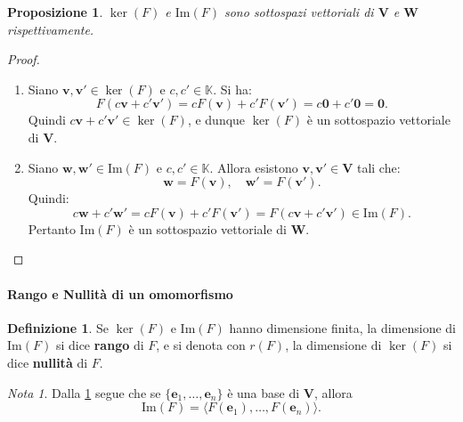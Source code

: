 \documentclass{article}
\theoremstyle{plain}
\newtheorem{prop}[thm]{Proposizione}
\theoremstyle{definition}
\newtheorem{defn}{Definizione}[section]
\theoremstyle{remark}
\newtheorem{note}{Nota}
\begin{document}
\vspace{10pt}

\begin{bxthm}
\begin{prop}
    $\ker(F)$ e $\mathrm{Im}(F)$ sono sottospazi vettoriali di $\mathbf{V}$ e $\mathbf{W}$ rispettivamente.     
\end{prop}
\end{bxthm}
\begin{proof}
    \begin{enumerate}
        \item Siano \( \mathbf{v}, \mathbf{v'} \in \ker(F) \) e \( c, c' \in \mathbb{K} \). Si ha:
        \[
        F(c\mathbf{v} + c'\mathbf{v'}) = cF(\mathbf{v}) + c'F(\mathbf{v'}) = c\mathbf{0} + c'\mathbf{0} = \mathbf{0}.
        \]
        Quindi \( c\mathbf{v} + c'\mathbf{v'} \in \ker(F) \), e dunque \( \ker(F) \) è un sottospazio vettoriale di \( \mathbf{V} \).
        
        \item Siano \( \mathbf{w}, \mathbf{w'} \in \mathrm{Im}(F) \) e \( c, c' \in \mathbb{K} \). Allora esistono \( \mathbf{v}, \mathbf{v'} \in \mathbf{V} \) tali che:
        \[
        \mathbf{w} = F(\mathbf{v}), \quad \mathbf{w'} = F(\mathbf{v'}).
        \]
        Quindi:
        \[
        c\mathbf{w} + c'\mathbf{w'} = cF(\mathbf{v}) + c'F(\mathbf{v'}) = F(c\mathbf{v} + c'\mathbf{v'}) \in \mathrm{Im}(F).
        \]
        Pertanto \( \mathrm{Im}(F) \) è un sottospazio vettoriale di \( \mathbf{W} \).
    \end{enumerate}
\end{proof}

\vspace{10pt}

\paragraph{Rango e Nullità di un omomorfismo}
\begin{bxthm}
\begin{defn}\label{intendiquesta}
    Se $\ker(F)$ e $\mathrm{Im}(F)$ hanno dimensione finita, la dimensione di $\mathrm{Im}(F)$ si dice \textbf{rango} di $F$, e si denota con $r(F)$, la dimensione di $\ker(F)$ si dice \textbf{nullità} di $F$.
\end{defn}
\end{bxthm}

\vspace{10pt}

\begin{note}
    Dalla \ref{intendiquesta} segue che se $\{\mathbf{e}_1,\ldots,\mathbf{e}_n\}$ è una base di $\mathbf{V}$, allora 
    \[\mathrm{Im}(F)=\langle F(\mathbf{e}_1),\ldots,F(\mathbf{e}_n)\rangle.\]
\end{note}
\end{document}
